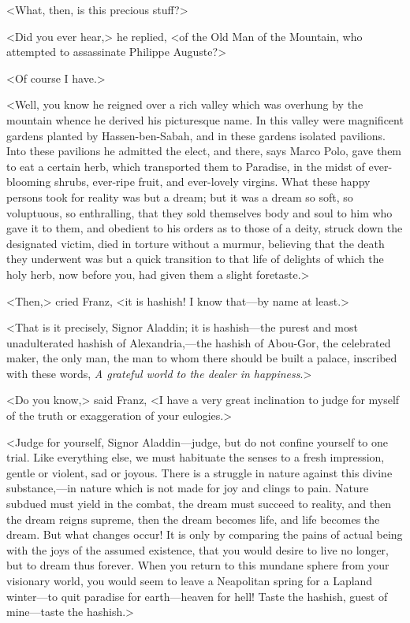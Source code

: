  <What, then, is this precious stuff?> 

 <Did you ever hear,> he replied, <of the Old Man of the Mountain, who attempted to assassinate Philippe Auguste?> 

 <Of course I have.> 

 <Well, you know he reigned over a rich valley which was overhung by the mountain whence he derived his picturesque name. In this valley were magnificent gardens planted by Hassen-ben-Sabah, and in these gardens isolated pavilions. Into these pavilions he admitted the elect, and there, says Marco Polo, gave them to eat a certain herb, which transported them to Paradise, in the midst of ever-blooming shrubs, ever-ripe fruit, and ever-lovely virgins. What these happy persons took for reality was but a dream; but it was a dream so soft, so voluptuous, so enthralling, that they sold themselves body and soul to him who gave it to them, and obedient to his orders as to those of a deity, struck down the designated victim, died in torture without a murmur, believing that the death they underwent was but a quick transition to that life of delights of which the holy herb, now before you, had given them a slight foretaste.> 

 <Then,> cried Franz, <it is hashish! I know that—by name at least.> 

 <That is it precisely, Signor Aladdin; it is hashish—the purest and most unadulterated hashish of Alexandria,—the hashish of Abou-Gor, the celebrated maker, the only man, the man to whom there should be built a palace, inscribed with these words, \textit{A grateful world to the dealer in happiness}.> 

 <Do you know,> said Franz, <I have a very great inclination to judge for myself of the truth or exaggeration of your eulogies.> 

 <Judge for yourself, Signor Aladdin—judge, but do not confine yourself to one trial. Like everything else, we must habituate the senses to a fresh impression, gentle or violent, sad or joyous. There is a struggle in nature against this divine substance,—in nature which is not made for joy and clings to pain. Nature subdued must yield in the combat, the dream must succeed to reality, and then the dream reigns supreme, then the dream becomes life, and life becomes the dream. But what changes occur! It is only by comparing the pains of actual being with the joys of the assumed existence, that you would desire to live no longer, but to dream thus forever. When you return to this mundane sphere from your visionary world, you would seem to leave a Neapolitan spring for a Lapland winter—to quit paradise for earth—heaven for hell! Taste the hashish, guest of mine—taste the hashish.> 

